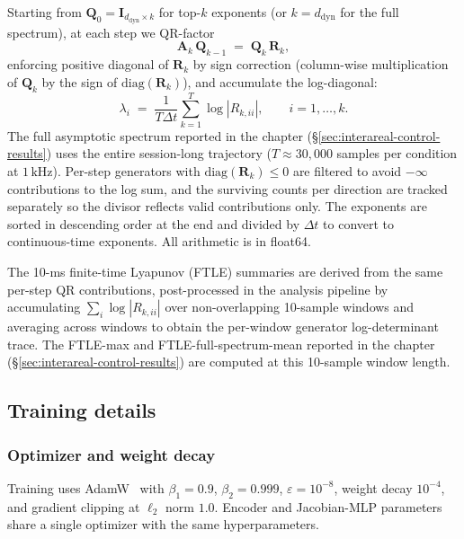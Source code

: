 Starting from $\mathbf{Q}_{0}=\mathbf{I}_{d_{\mathrm{dyn}}\times k}$ for top-$k$ exponents (or $k=d_{\mathrm{dyn}}$ for the full spectrum), at each step we QR-factor
\begin{equation}
\mathbf{A}_{k}\,\mathbf{Q}_{k-1} \;=\; \mathbf{Q}_{k}\,\mathbf{R}_{k},
\end{equation}
enforcing positive diagonal of $\mathbf{R}_{k}$ by sign correction (column-wise multiplication of $\mathbf{Q}_{k}$ by the sign of $\mathrm{diag}(\mathbf{R}_{k})$), and accumulate the log-diagonal:
\begin{equation}
\lambda_{i} \;=\; \frac{1}{T\Delta t}\sum_{k=1}^{T}\log|R_{k,ii}|, \qquad i=1,\ldots,k.
\end{equation}
The full asymptotic spectrum reported in the chapter (\S\ref{sec:interareal-control-results}) uses the entire session-long trajectory ($T\approx 30{,}000$ samples per condition at $1\,\mathrm{kHz}$). Per-step generators with $\mathrm{diag}(\mathbf{R}_{k})\leq 0$ are filtered to avoid $-\infty$ contributions to the log sum, and the surviving counts per direction are tracked separately so the divisor reflects valid contributions only. The exponents are sorted in descending order at the end and divided by $\Delta t$ to convert to continuous-time exponents. All arithmetic is in float64.

The 10-ms finite-time Lyapunov (FTLE) summaries are derived from the same per-step QR contributions, post-processed in the analysis pipeline by accumulating $\sum_{i}\log|R_{k,ii}|$ over non-overlapping 10-sample windows and averaging across windows to obtain the per-window generator log-determinant trace. The FTLE-max and FTLE-full-spectrum-mean reported in the chapter (\S\ref{sec:interareal-control-results}) are computed at this 10-sample window length.

\subsection{Training details}\label{supp:interareal-control-training}

\subsubsection{Optimizer and weight decay}\label{supp:interareal-control-opt}

Training uses AdamW~\cite{Loshchilov2019-bv} with $\beta_{1}=0.9$, $\beta_{2}=0.999$, $\varepsilon=10^{-8}$, weight decay $10^{-4}$, and gradient clipping at $\ell_{2}$ norm $1.0$. Encoder and Jacobian-MLP parameters share a single optimizer with the same hyperparameters.

